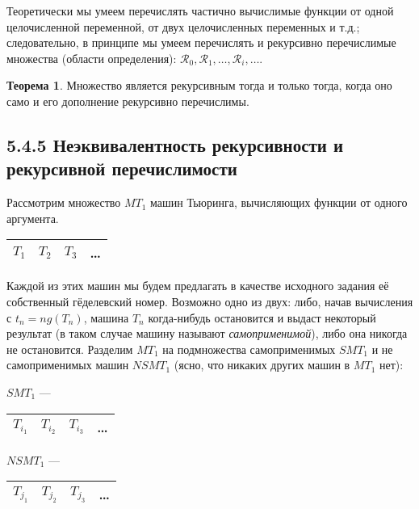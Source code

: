 \documentclass[a4paper, 12pt]{article}  %
\theoremstyle{definition}
\newtheorem*{theorem}{Теорема}
\begin{document}
		Теоретически мы умеем перечислять частично вычислимые функции от одной целочисленной переменной, от
		двух целочисленных переменных и т.д.; следовательно, в принципе мы умеем перечислять и рекурсивно
		перечислимые множества (области определения):
		$\mathscr{R}_0, \mathscr{R}_1, \dots, \mathscr{R}_i, \dots$.
		
		\begin{theorem}
			Множество является рекурсивным тогда и только тогда, когда оно само и его дополнение рекурсивно
			перечислимы.
		\end{theorem}
		
	\subsection*{5.4.5 Неэквивалентность рекурсивности и рекурсивной перечислимости}
		
		Рассмотрим множество $MT_1$ машин Тьюринга, вычисляющих функции от одного аргумента.
		\begin{center}
			\begin{tabular}{|c|c|c|c}
				\hline
				$T_1$ & $T_2$ & $T_3$ & \dots  \\
				\hline
			\end{tabular}
		\end{center}
		
		Каждой из этих машин мы будем предлагать в качестве исходного задания её собственный гёделевский
		номер. Возможно одно из двух: либо, начав вычисления с $t_n = ng(T_n)$, машина $T_n$ когда-нибудь
		остановится и выдаст некоторый результат (в таком случае машину называют \textit{самоприменимой}),
		либо она никогда не остановится. Разделим $MT_1$ на подмножества самоприменимых $SMT_1$ и не самоприменимых машин $NSMT_1$ (ясно, что никаких других машин в $MT_1$ нет):
		
		\begin{center}
			\begin{multicols}{2}	
				$SMT_1$ ---
				\begin{tabular}{|c|c|c|c}
					\hline
					$T_{i_1}$ & $T_{i_2}$ & $T_{i_3}$ & \dots  \\
					\hline
				\end{tabular}
			
				$NSMT_1$ ---
				\begin{tabular}{|c|c|c|c}
					\hline
					$T_{j_1}$ & $T_{j_2}$ & $T_{j_3}$ & \dots  \\
					\hline
				\end{tabular}
			\end{multicols}
		\end{center}
		
\end{document}
